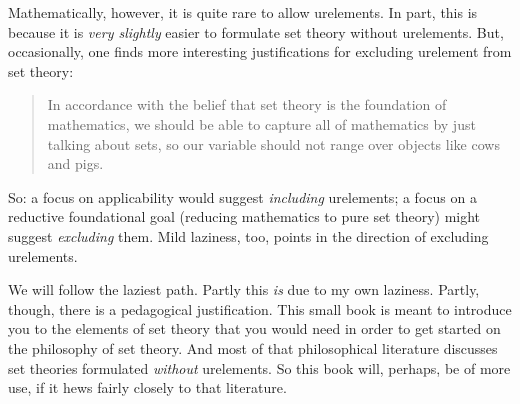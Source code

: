 \documentclass[../../../include/open-logic-section]{subfiles}
\begin{document}
Mathematically, however, it is quite rare to allow urelements. In
part, this is because it is \emph{very slightly} easier to formulate
set theory without urelements. But, occasionally, one finds more
interesting justifications for excluding urelement from set theory:
\begin{quote}
	In accordance with the belief that set theory is the foundation of
	mathematics, we should be able to capture all of mathematics by
	just talking about sets, so our variable should not range over
	objects like cows and pigs. 
	\citep[p.~8]{Kunen1980}
\end{quote}
So: a focus on applicability would suggest \emph{including}
urelements; a focus on a reductive foundational goal (reducing
mathematics to pure set theory) might suggest \emph{excluding} them.
Mild laziness, too, points in the direction of excluding urelements. 

We will follow the laziest path. Partly this \emph{is} due to my own
laziness. Partly, though, there is a pedagogical justification. This
small book is meant to introduce you to the elements of set theory
that you would need in order to get started on the philosophy of set
theory. And most of that philosophical literature discusses set
theories formulated \emph{without} urelements. So this book will,
perhaps, be of more use, if it hews fairly closely to that literature.
\end{document}

